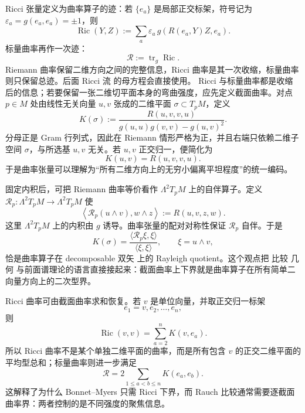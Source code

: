 Ricci 张量定义为曲率算子的迹：若 $\{e_a\}$ 是局部正交标架，符号记为 $\varepsilon_a=g(e_a,e_a)=\pm1$，则
\begin{equation}\label{eq:math-dg-ricci-definition}
\operatorname{Ric}(Y,Z)
:=\sum_a\varepsilon_a\,g(R(e_a,Y)Z,e_a).
\end{equation}
标量曲率再作一次迹：
\begin{equation*}\mathcal R:=\operatorname{tr}_g\operatorname{Ric}.
\end{equation*}
Riemann 曲率保留二维方向之间的完整信息，Ricci 曲率是其一次收缩，标量曲率则只保留总迹。后面 Ricci 流 的母方程会直接使用。
Ricci 与标量曲率都是收缩后的信息；若要保留一张二维切平面本身的弯曲强度，应先定义截面曲率。对点 $p\in M$ 处由线性无关向量 $u,v$ 张成的二维平面 $\sigma\subset T_pM$，定义
\begin{equation*}K(\sigma)
:=\frac{R(u,v,v,u)}{g(u,u)g(v,v)-g(u,v)^2}.
\end{equation*}
分母正是 Gram 行列式，因此在 Riemann 情形严格为正，并且右端只依赖二维子空间 $\sigma$，与所选基 $u,v$ 无关。若 $u,v$ 正交归一，便简化为
\[
K(u,v)=R(u,v,v,u).
\]
于是曲率张量可以理解为“所有二维方向上的无穷小偏离平坦程度”的统一编码。

固定内积后，可把 Riemann 曲率等价看作 $\Lambda^2T_pM$ 上的自伴算子。定义 $\mathcal R_p:\Lambda^2T_pM\to\Lambda^2T_pM$ 使
\begin{equation*}\left\langle \mathcal R_p(u\wedge v),w\wedge z\right\rangle
:=R(u,v,z,w).
\end{equation*}
这里 $\Lambda^2T_pM$ 上的内积由 $g$ 诱导。曲率张量的配对对称性保证 $\mathcal R_p$ 自伴。于是
\[
K(\sigma)
=\frac{\langle \mathcal R_p\xi,\xi\rangle}{\langle\xi,\xi\rangle},
\qquad
\xi=u\wedge v,
\]
恰是曲率算子在 decomposable 双矢 上的 Rayleigh quotient。这个观点把 比较 几何 与前面谱理论的语言直接接起来：截面曲率上下界就是曲率算子在所有简单二向量方向上的二次型界。

Ricci 曲率可由截面曲率求和恢复。若 $v$ 是单位向量，并取正交归一标架
\[
e_1=v,e_2,\ldots,e_n,
\]
则
\begin{equation*}\operatorname{Ric}(v,v)
=\sum_{a=2}^{n}K(v,e_a).
\end{equation*}
所以 Ricci 曲率不是某个单独二维平面的曲率，而是所有包含 $v$ 的正交二维平面的平均型总和；标量曲率则进一步满足
\begin{equation*}\mathcal R
=2\sum_{1\le a<b\le n}K(e_a,e_b).
\end{equation*}
这解释了为什么 Bonnet--Myers 只需 Ricci 下界，而 Rauch 比较通常需要逐截面曲率界：两者控制的是不同强度的聚焦信息。

